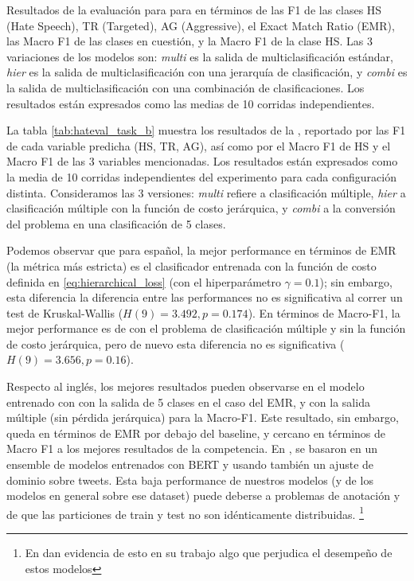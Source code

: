 \begin{table}[t]
    \caption{Resultados de la evaluación para para \subtaskb{} en términos de las F1 de las clases HS (Hate Speech), TR (Targeted), AG (Aggressive), el Exact Match Ratio (EMR), las Macro F1 de las clases en cuestión, y la Macro F1 de la clase HS. Las 3 variaciones de los modelos son: \emph{multi} es la salida de multiclasificación estándar, \emph{hier} es la salida de multiclasificación con una jerarquía de clasificación, y \emph{combi} es la salida de multiclasificación con una combinación de clasificaciones. Los resultados están expresados como las medias de 10 corridas independientes.}
    \label{tab:hateval_task_b}
\end{table}


La tabla \ref{tab:hateval_task_b} muestra los resultados de la \subtaskb{}, reportado por las F1 de cada variable predicha (HS, TR, AG), así como por el Macro F1 de HS y el Macro F1 de las 3 variables mencionadas. Los resultados están expresados como la media de 10 corridas independientes del experimento para cada configuración distinta. Consideramos las 3 versiones: \emph{multi} refiere a clasificación múltiple, \emph{hier} a clasificación múltiple con la función de costo jerárquica, y \emph{combi} a la conversión del problema en una clasificación de 5 clases.

Podemos observar que para español, la mejor performance en términos de EMR (la métrica más estricta) es el clasificador entrenada con la función de costo definida en \ref{eq:hierarchical_loss} (con el hiperparámetro $\gamma = 0.1$); sin embargo, esta diferencia la diferencia entre las performances no es significativa al correr un test de Kruskal-Wallis ($H(9) = 3.492, p = 0.174$). En términos de Macro-F1, la mejor performance es de \beto{} con el problema de clasificación múltiple y sin la función de costo jerárquica, pero de nuevo esta diferencia no es significativa ($H(9) = 3.656, p=0.16$).

Respecto al inglés, los mejores resultados pueden observarse en el modelo entrenado con \bertweet{} con la salida de 5 clases en el caso del EMR, y con la salida múltiple (sin pérdida jerárquica) para la Macro-F1. Este resultado, sin embargo, queda en términos de EMR por debajo del baseline, y cercano en términos de Macro F1 a los mejores resultados de la competencia. En \citet{gertner-etal-2019-mitre}, se basaron en un ensemble de modelos entrenados con BERT y usando también un ajuste de dominio sobre tweets. Esta baja performance de nuestros modelos (y de los modelos en general sobre ese dataset) puede deberse a problemas de anotación y de que las particiones de train y test no son idénticamente distribuidas. \footnote{En\citet{gertner-etal-2019-mitre} dan evidencia de esto en su trabajo algo que perjudica el desempeño de estos modelos}



